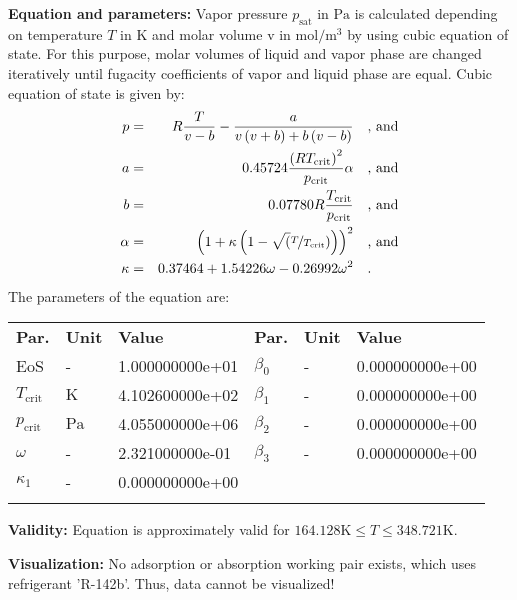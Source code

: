 \textbf{Equation and parameters:}
\newline
%
Vapor pressure $p_\mathrm{sat}$ in $\si{\pascal}$ is calculated depending on temperature $T$ in $\si{\kelvin}$ and molar volume v in $\si{\mole\per\cubic\meter}$ by using cubic equation of state. For this purpose, molar volumes of liquid and vapor phase are changed iteratively until fugacity coefficients of vapor and liquid phase are equal. Cubic equation of state is given by:
\begin{equation*}
\begin{split}
p &=& R \frac{T}{v - b} - \frac{a}{v \left(v + b\right) + b \left(v - b\right)} & \quad\text{, and} \\
a &=& 0.45724 \frac{\left(R T_\mathrm{crit} \right)^2}{p_\mathrm{crit}} \alpha & \quad\text{, and} \\
b &=& 0.07780 R \frac{T_\mathrm{crit}}{p_\mathrm{crit}} & \quad\text{, and} \\
\alpha &=& \left(1 + \kappa \left(1 - \sqrt(\nicefrac{T}{T_\mathrm{crit}}) \right) \right)^2 & \quad\text{, and} \\
\kappa &=& 0.37464 + 1.54226 \omega - 0.26992 \omega^2 & \quad\text{.}
\end{split}
\end{equation*}
%
The parameters of the equation are:
%
\begin{longtable}[l]{lll|lll}
\toprule
\addlinespace
\textbf{Par.} & \textbf{Unit} & \textbf{Value} &	\textbf{Par.} & \textbf{Unit} & \textbf{Value} \\
\addlinespace
\midrule
\endhead

\bottomrule
\endfoot
\bottomrule
\endlastfoot
\addlinespace

EoS & - & 1.000000000e+01 & $\beta_0$ & - & 0.000000000e+00 \\
$T_\mathrm{crit}$ & $\si{\kelvin}$ & 4.102600000e+02 & $\beta_1$ & - & 0.000000000e+00 \\
$p_\mathrm{crit}$ & $\si{\pascal}$ & 4.055000000e+06 & $\beta_2$ & - & 0.000000000e+00 \\
$\omega$ & - & 2.321000000e-01 & $\beta_3$ & - & 0.000000000e+00 \\
$\kappa_1$ & - & 0.000000000e+00 & & & \\

\addlinespace\end{longtable}

\textbf{Validity:}
\newline
Equation is approximately valid for $164.128 \si{\kelvin} \leq T \leq 348.721 \si{\kelvin}$.
\newline

\textbf{Visualization:}
%
\newline
No adsorption or absorption working pair exists, which uses refrigerant 'R-142b'. Thus, data cannot be visualized!
%

\FloatBarrier
\newpage
